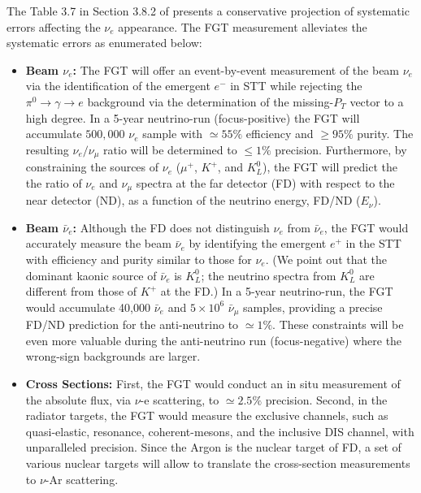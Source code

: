 The Table 3.7 
in Section 3.8.2 of \volphys
presents a conservative projection of systematic errors affecting the
$\nu_e$ appearance. The FGT measurement alleviates the systematic
errors as enumerated below:
\begin{itemize}
    \item {\bf Beam $\nu_e$:} The FGT will offer an event-by-event  measurement of the beam $\nu_e$ via the  identification 
    of the emergent $e^-$ in STT while rejecting the $\pi^0 \rightarrow \gamma \rightarrow e$  
    background via the determination of the missing-$P_T$ vector to a high degree.  In a 5-year neutrino-run (focus-positive) 
    the FGT will accumulate $500,000$ $\nu_e$ sample with $\simeq 55\%$ efficiency and  $\geq 95\%$ purity.  
    The resulting $\nu_e / \nu_\mu$ ratio will be determined to  $\leq 1\%$ precision. Furthermore, 
    by constraining the sources of $\nu_e$ ($\mu^+$, $K^+$, and $K^0_L$),   the FGT will predict the the ratio of  
    $\nu_e$ and $\nu_\mu$ spectra at the far detector (FD) with respect to the near detector (ND), as a function 
    of the neutrino energy, FD/ND ($E_\nu$).    

    \item {\bf  Beam $\bar\nu_e$:} Although the FD does not distinguish $\nu_e$ from $\bar\nu_e$, the FGT would 
    accurately measure the beam $\bar\nu_e$ by identifying the emergent $e^+$ in the STT with efficiency and purity 
    similar to those for $\nu_e$.  (We point out that the dominant kaonic source of $\bar\nu_e$ is $K^0_L$; 
    the neutrino spectra from $K^0_L$ are different from those of $K^+$ at the FD.)  In a 5-year neutrino-run, the FGT 
    would accumulate 40,000 $\bar\nu_e$ and $5\times 10^6$ $\bar\nu_\mu$ samples, providing a precise FD/ND 
    prediction for the anti-neutrino to $\simeq 1\%$. 
    These constraints will be even more valuable during the anti-neutrino run (focus-negative) where the wrong-sign 
    backgrounds are larger.  

    \item {\bf  Cross Sections:} First, the FGT would conduct an in situ measurement of  the absolute flux, via $\nu$-e 
    scattering, to $\simeq 2.5\%$ precision. Second, in the radiator targets, the FGT would measure the exclusive channels, 
    such as quasi-elastic, resonance, coherent-mesons, and the inclusive DIS channel, with unparalleled precision. Since 
    the Argon is the nuclear target of FD, a set of various nuclear targets will allow to translate the cross-section   
    measurements to $\nu$-Ar scattering. 


\end{itemize}
